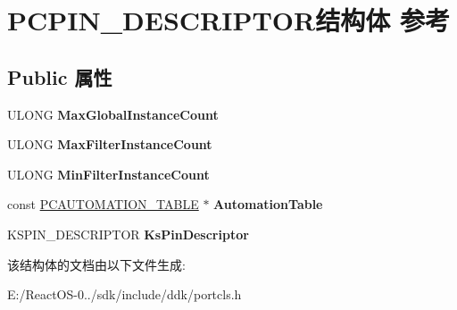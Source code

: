 \hypertarget{struct_p_c_p_i_n___d_e_s_c_r_i_p_t_o_r}{}\section{P\+C\+P\+I\+N\+\_\+\+D\+E\+S\+C\+R\+I\+P\+T\+O\+R结构体 参考}
\label{struct_p_c_p_i_n___d_e_s_c_r_i_p_t_o_r}
\subsection*{Public 属性}
\begin{DoxyCompactItemize}
\item 
\mbox{\label{struct_p_c_p_i_n___d_e_s_c_r_i_p_t_o_r_a86ec556ed2f4246c82461c2a681cc69c}} 
U\+L\+O\+NG {\bfseries Max\+Global\+Instance\+Count}
\item 
\mbox{\label{struct_p_c_p_i_n___d_e_s_c_r_i_p_t_o_r_ae48939eb47723323dc8784626ae0c264}} 
U\+L\+O\+NG {\bfseries Max\+Filter\+Instance\+Count}
\item 
\mbox{\label{struct_p_c_p_i_n___d_e_s_c_r_i_p_t_o_r_a8a7c83c9832408822b5bf0566fd92ba6}} 
U\+L\+O\+NG {\bfseries Min\+Filter\+Instance\+Count}
\item 
\mbox{\label{struct_p_c_p_i_n___d_e_s_c_r_i_p_t_o_r_a9a1ced0ed7d08eebc903b8ae73148dcb}} 
const \hyperlink{struct_p_c_a_u_t_o_m_a_t_i_o_n___t_a_b_l_e}{P\+C\+A\+U\+T\+O\+M\+A\+T\+I\+O\+N\+\_\+\+T\+A\+B\+LE} $\ast$ {\bfseries Automation\+Table}
\item 
\mbox{\label{struct_p_c_p_i_n___d_e_s_c_r_i_p_t_o_r_a92125bcdc5e5b1efbb156c84e7ccdbc6}} 
K\+S\+P\+I\+N\+\_\+\+D\+E\+S\+C\+R\+I\+P\+T\+OR {\bfseries Ks\+Pin\+Descriptor}
\end{DoxyCompactItemize}


该结构体的文档由以下文件生成\+:\begin{DoxyCompactItemize}
\item 
E\+:/\+React\+O\+S-\/0../sdk/include/ddk/portcls.\+h\end{DoxyCompactItemize}
